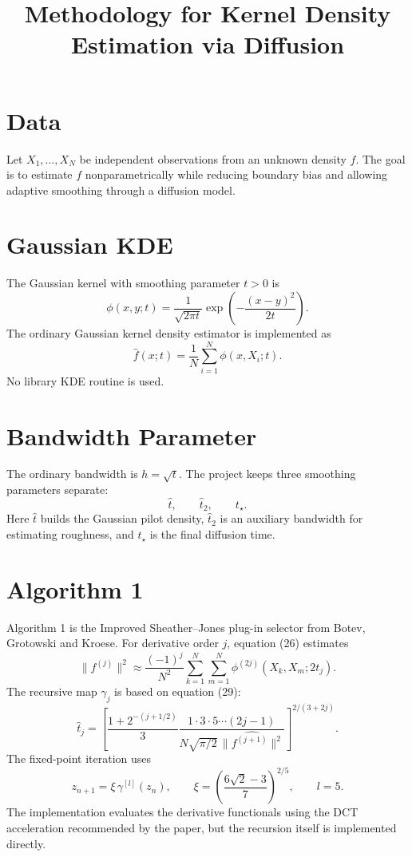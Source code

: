 \documentclass[11pt]{article}
\title{Methodology for Kernel Density Estimation via Diffusion}
\author{}
\date{}
\begin{document}
\maketitle

\section{Data}

Let \(X_1,\ldots,X_N\) be independent observations from an unknown density
\(f\). The goal is to estimate \(f\) nonparametrically while reducing boundary
bias and allowing adaptive smoothing through a diffusion model.

\section{Gaussian KDE}

The Gaussian kernel with smoothing parameter \(t>0\) is
\[
\phi(x,y;t)
=
\frac{1}{\sqrt{2\pi t}}
\exp\left(-\frac{(x-y)^2}{2t}\right).
\]
The ordinary Gaussian kernel density estimator is implemented as
\[
\widehat f(x;t)
=
\frac{1}{N}\sum_{i=1}^N \phi(x,X_i;t).
\]
No library KDE routine is used.

\section{Bandwidth Parameter}

The ordinary bandwidth is \(h=\sqrt{t}\). The project keeps three smoothing
parameters separate:
\[
\widehat t,\qquad \widehat t_2,\qquad t_\star.
\]
Here \(\widehat t\) builds the Gaussian pilot density, \(\widehat t_2\) is an
auxiliary bandwidth for estimating roughness, and \(t_\star\) is the final
diffusion time.

\section{Algorithm 1}

Algorithm 1 is the Improved Sheather--Jones plug-in selector from Botev,
Grotowski and Kroese. For derivative order \(j\), equation (26) estimates
\[
\|f^{(j)}\|^2
\approx
\frac{(-1)^j}{N^2}
\sum_{k=1}^N \sum_{m=1}^N
\phi^{(2j)}(X_k,X_m;2t_j).
\]
The recursive map \(\gamma_j\) is based on equation (29):
\[
\widehat t_j
=
\left[
\frac{1+2^{-(j+1/2)}}{3}
\frac{1\cdot 3\cdot 5\cdots(2j-1)}
{N\sqrt{\pi/2}\,\widehat{\|f^{(j+1)}\|^2}}
\right]^{2/(3+2j)}.
\]
The fixed-point iteration uses
\[
z_{n+1}
=
\xi\,\gamma^{[l]}(z_n),
\qquad
\xi
=
\left(\frac{6\sqrt 2-3}{7}\right)^{2/5},
\qquad l=5.
\]
The implementation evaluates the derivative functionals using the DCT
acceleration recommended by the paper, but the recursion itself is implemented
directly.
\end{document}
